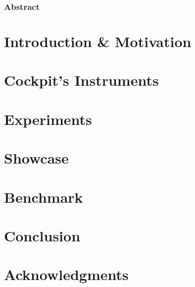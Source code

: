 \subsubsection{Abstract}
\Blindtext


\section{Introduction \& Motivation}\label{paper-2::sec:intro}

\section{Cockpit's Instruments}\label{paper-2::sec:instruments}

\section{Experiments}\label{paper-2::sec:experiments}

\section{Showcase}\label{paper-2::sec:showcase}

\section{Benchmark}\label{paper-2::sec:benchmark}

\section{Conclusion}\label{paper-2::sec:conclusion}

\section*{Acknowledgments}
\blindtext

